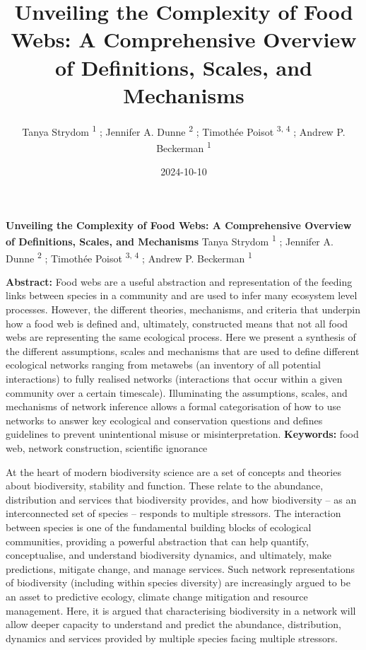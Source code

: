 \documentclass[
]{article}
\title{Unveiling the Complexity of Food Webs: A Comprehensive Overview
of Definitions, Scales, and Mechanisms}
\author{Tanya Strydom %
%
\textsuperscript{%
%
1%
}%
; Jennifer A. Dunne %
%
\textsuperscript{%
%
2%
}%
; Timothée Poisot %
%
\textsuperscript{%
3,%
4%
}%
; Andrew P. Beckerman %
%
\textsuperscript{%
%
1%
}%
}
\date{2024-10-10}
\begin{document}
\thispagestyle{empty}
{\bfseries\sffamily\Large Unveiling the Complexity of Food Webs: A
Comprehensive Overview of Definitions, Scales, and Mechanisms}
\vfil
Tanya Strydom %
%
\textsuperscript{%
%
1%
}%
; Jennifer A. Dunne %
%
\textsuperscript{%
%
2%
}%
; Timothée Poisot %
%
\textsuperscript{%
3,%
4%
}%
; Andrew P. Beckerman %
%
\textsuperscript{%
%
1%
}%

\vfil
{\small
\textbf{Abstract:} Food webs are a useful abstraction and representation
of the feeding links between species in a community and are used to
infer many ecosystem level processes. However, the different theories,
mechanisms, and criteria that underpin how a food web is defined and,
ultimately, constructed means that not all food webs are representing
the same ecological process. Here we present a synthesis of the
different assumptions, scales and mechanisms that are used to define
different ecological networks ranging from metawebs (an inventory of all
potential interactions) to fully realised networks (interactions that
occur within a given community over a certain timescale). Illuminating
the assumptions, scales, and mechanisms of network inference allows a
formal categorisation of how to use networks to answer key ecological
and conservation questions and defines guidelines to prevent
unintentional misuse or misinterpretation.
\vfil
\textbf{Keywords:} %
food web, network construction, %
scientific ignorance%
}
\clearpage
\setcounter{page}{1}
\doublespacing
\linenumbers


At the heart of modern biodiversity science are a set of concepts and
theories about biodiversity, stability and function. These relate to the
abundance, distribution and services that biodiversity provides, and how
biodiversity -- as an interconnected set of species -- responds to
multiple stressors. The interaction between species is one of the
fundamental building blocks of ecological communities, providing a
powerful abstraction that can help quantify, conceptualise, and
understand biodiversity dynamics, and ultimately, make predictions,
mitigate change, and manage services. Such network representations of
biodiversity (including within species diversity) are increasingly
argued to be an asset to predictive ecology, climate change mitigation
and resource management. Here, it is argued that characterising
biodiversity in a network will allow deeper capacity to understand and
predict the abundance, distribution, dynamics and services provided by
multiple species facing multiple stressors.
\end{document}
